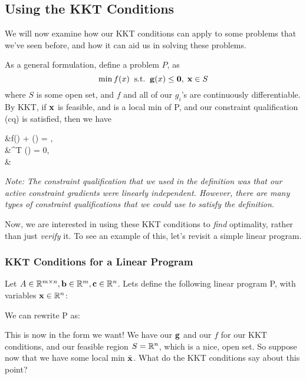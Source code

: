 
\subsection{Using the KKT Conditions}

We will now examine how our KKT conditions can apply to some problems
that we've seen before, and how it can aid us in solving these problems.

As a general formulation, 
define a problem $P$, as \[\min f(x) \;\; \text{s.t.} \;\; \mathbf{g}(x) \leq \mathbf{0},
\; \mathbf{x} \in S\] where $S$ is some open set, and $f$ and all of our $g_i$'s are
continuously differentiable.
By KKT, if $\mathbf{x}$ is feasible, and is a local min of P, and our constraint 
qualification (cq) is satisfied, then we have
\begin{frml}
	&\nabla f(\vx) + \nabla \vg(\vx) \vlambda = \vzero, \\
	&\vlambda^T \vg(\vx) = 0, \\
	&\vlambda \geq \vzero
\end{frml}
\textit{Note: The constraint qualification that we used in the definition was 
	that our active constraint gradients were linearly independent. 
However, there are \textit{many} types of constraint qualifications that we could 
use to satisfy the definition.}

Now, we are interested in using these KKT conditions to \textit{find} optimality, 
rather than just \textit{verify} it. 
To see an example of this, let's revisit a simple linear program.

\subsubsection{KKT Conditions for a Linear Program}

Let $A \in \mathbb{R}^{m \times n}, \mathbf{b} \in \mathbb{R}^m, \mathbf{c} \in \mathbb{R}^n$.
Lets define the following linear program P, with variables $\mathbf{x} \in \mathbb{R}^n$:

We can rewrite P as:

This is now in the form we want! We have our $\mathbf{g}$ and our $f$ for our
KKT conditions, and our feasible region $S = \mathbb{R}^n$, which is a nice, open set. 
So suppose now that we have some local min $\bar{\mathbf{x}}$. What do the KKT conditions
say about this point?

